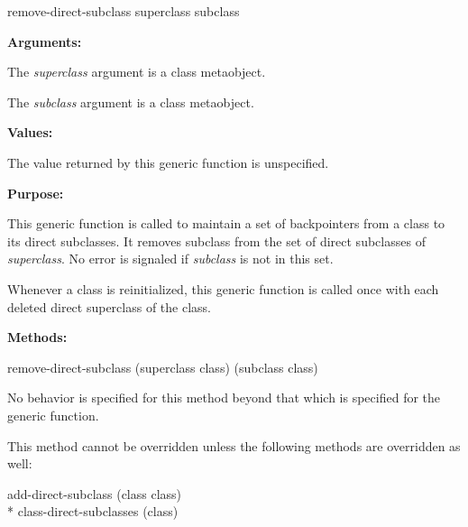 \begin{defun}
remove-direct-subclass superclass subclass

\textbf{Arguments:}

The \emph{superclass} argument is a class metaobject.

The \emph{subclass} argument is a class metaobject.

\textbf{Values:}

The value returned by this generic function is unspecified.

\textbf{Purpose:}

This generic function is called to maintain a set of backpointers from a class
to its direct subclasses. It removes subclass from the set of direct subclasses
of \emph{superclass}. No error is signaled if \emph{subclass} is not in this
set.

Whenever a class is reinitialized, this generic function is called once with
each deleted direct superclass of the class.

\textbf{Methods:}

\begin{defun}
remove-direct-subclass (superclass class) (subclass class)

No behavior is specified for this method beyond that which is specified for the
generic function.

This method cannot be overridden unless the following methods are overridden as
well:

\begin{tabbing}
    add-direct-subclass (class class)\\*
    class-direct-subclasses (class) 
\end{tabbing}
\end{defun}
\end{defun}

